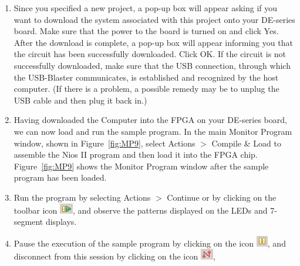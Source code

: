 \documentclass[epsfig,10pt,fullpage]{article}
\begin{document}
\begin{enumerate}
\item Since you specified a new project, a pop-up box will appear asking if
you want to download the system associated with this project onto your DE-series board.
Make sure that the power to the board is turned on and click {\sf Yes}.
After the download is complete, a pop-up box
will appear informing you that the circuit has been successfully downloaded. Click {\sf OK}.
If the circuit is not successfully downloaded, make sure that the USB connection, through 
which the USB-Blaster communicates, is established and recognized by the host computer. 
(If there is a problem, a possible
remedy may be to unplug the USB cable and then plug it back in.)
\item Having downloaded the Computer into the FPGA on your DE-series board, 
we can now load and run the sample program.
In the main Monitor Program window, shown in Figure~\ref{fig:MP9}, 
select {\sf Actions $>$ Compile \& Load} 
to assemble the Nios II program and then load it into the FPGA chip.
Figure~\ref{fig:MP9} shows the Monitor Program window after the sample program has been loaded. 
\item Run the program by selecting {\sf Actions $>$ Continue} or
by clicking on the toolbar icon \hbox{\includegraphics[scale=0.8]{figures/icon_continue.png}}, 
and observe the patterns displayed on the LEDs and 7-segment displays. 
\item Pause the execution of the sample program by clicking on the 
icon \hbox{\includegraphics[scale=0.8]{figures/icon_pause.png}}, 
and disconnect from this session
by clicking on the icon \hbox{\includegraphics[scale=0.8]{figures/icon_disconn.png}}, 


\end{enumerate}
\end{document}

